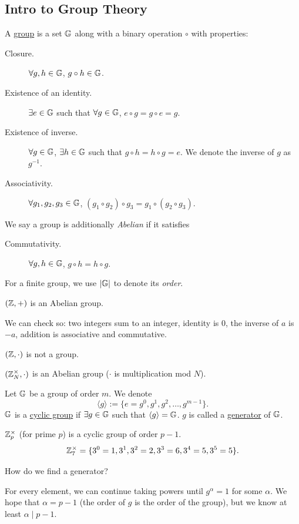 \subsection{Intro to Group Theory}
\begin{definition}[Group]
    A \ul{group} is a set $\mathbb G$ along with a binary operation $\circ$ with properties:
    \begin{description}
        \item[Closure.] $\forall g, h\in \mathbb G$, $g\circ h\in \mathbb G$.
        \item[Existence of an identity.] $\exists e\in \mathbb G$ such that $\forall g\in \mathbb G$, $e\circ g = g\circ e = g$.
        \item[Existence of inverse.] $\forall g\in \mathbb G$, $\exists h\in \mathbb G$ such that $g\circ h = h\circ g = e$. We denote the inverse of $g$ as $g^{-1}$.
        \item[Associativity.] $\forall g_1, g_2, g_3\in \mathbb G$, $(g_1\circ g_2)\circ g_3 = g_1\circ(g_2\circ g_3)$.
    \end{description}

    We say a group is additionally \emph{Abelian} if it satisfies
    \begin{description}
        \item[Commutativity.] $\forall g, h\in \mathbb G$, $g\circ h = h \circ g$.
    \end{description}
    For a finite group, we use $|\mathbb G|$ to denote its \emph{order}.
\end{definition}
\begin{example}
    $(\mathbb Z, +)$ is an Abelian group.

    We can check so: two integers sum to an integer, identity is $0$, the inverse of $a$ is $-a$, addition is associative and commutative.

    $(\mathbb Z, \cdot)$ is not a group.

    $(\mathbb Z_N^\times, \cdot)$ is an Abelian group ($\cdot$ is multiplication mod $N$).
\end{example}

\begin{definition}
    Let $\mathbb G$ be a group of order $m$. We denote
    \[\langle g\rangle := \{e=g^0, g^1, g^2, \dots, g^{m-1}\}.\]
    $\mathbb G$ is a \ul{cyclic group} if $\exists g\in \mathbb G$ such that $\langle g\rangle = \mathbb G$. $g$ is called a \ul{generator} of $\mathbb G$.
\end{definition}

\begin{example*}
    $\mathbb Z_p^\times$ (for prime $p$) is a cyclic group of order $p-1$.
    \[\mathbb Z_7^\times = \{3^0 = 1, 3^1, 3^2=2, 3^3 = 6, 3^4 = 5, 3^5 = 5\}.\]
\end{example*}
\begin{ques*}
    How do we find a generator?
\end{ques*}
For every element, we can continue taking powers until $g^\alpha = 1$ for some $\alpha$. We hope that $\alpha = p-1$ (the order of $g$ is the order of the group), but we know at least $\alpha \mid p-1$.

